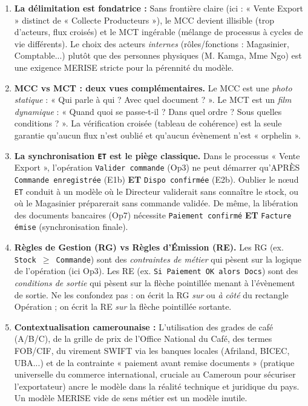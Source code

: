 \documentclass[11pt]{article}
\begin{document}
\begin{enumerate}
    \item \textbf{La délimitation est fondatrice :} Sans frontière claire (ici : « Vente Export » distinct de « Collecte Producteurs »), le MCC devient illisible (trop d'acteurs, flux croisés) et le MCT ingérable (mélange de processus à cycles de vie différents). Le choix des acteurs \emph{internes} (rôles/fonctions : Magasinier, Comptable...) plutôt que des personnes physiques (M. Kamga, Mme Ngo) est une exigence MERISE stricte pour la pérennité du modèle.
    \item \textbf{MCC vs MCT : deux vues complémentaires.} Le MCC est une \emph{photo statique} : « Qui parle à qui ? Avec quel document ? ». Le MCT est un \emph{film dynamique} : « Quand quoi se passe-t-il ? Dans quel ordre ? Sous quelles conditions ? ». La vérification croisée (tableau de cohérence) est la seule garantie qu'aucun flux n'est oublié et qu'aucun évènement n'est « orphelin ».
    \item \textbf{La synchronisation \texttt{ET} est le piège classique.} Dans le processus « Vente Export », l'opération \texttt{Valider commande} (Op3) ne peut démarrer qu'APRÈS \texttt{Commande enregistrée} (E1b) \textbf{ET} \texttt{Dispo confirmée} (E2b). Oublier le nœud \texttt{ET} conduit à un modèle où le Directeur validerait sans connaître le stock, ou où le Magasinier préparerait sans commande validée. De même, la libération des documents bancaires (Op7) nécessite \texttt{Paiement confirmé} \textbf{ET} \texttt{Facture émise} (synchronisation finale).
    \item \textbf{Règles de Gestion (RG) vs Règles d'Émission (RE).} Les RG (ex. \texttt{Stock $\ge$ Commande}) sont des \emph{contraintes de métier} qui pèsent sur la logique de l'opération (ici Op3). Les RE (ex. \texttt{Si Paiement OK alors Docs}) sont des \emph{conditions de sortie} qui pèsent sur la flèche pointillée menant à l'évènement de sortie. Ne les confondez pas : on écrit la RG \emph{sur} ou \emph{à côté} du rectangle Opération ; on écrit la RE \emph{sur} la flèche pointillée sortante.
    \item \textbf{Contextualisation camerounaise :} L'utilisation des grades de café (A/B/C), de la grille de prix de l'Office National du Café, des termes FOB/CIF, du virement SWIFT via les banques locales (Afriland, BICEC, UBA...) et de la contrainte « paiement avant remise documents » (pratique universelle du commerce international, cruciale au Cameroun pour sécuriser l'exportateur) ancre le modèle dans la réalité technique et juridique du pays. Un modèle MERISE vide de sens métier est un modèle inutile.
\end{enumerate}
\end{document}

